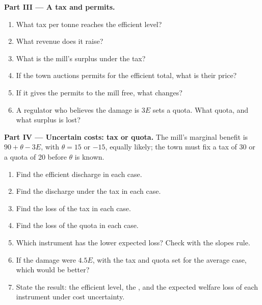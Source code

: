 \begin{problem}
\medskip
\noindent\textbf{Part III --- A tax and permits.}
\begin{enumerate}[resume]
  \item What tax per tonne reaches the efficient level?
  \item What revenue does it raise?
  \item What is the mill's surplus under the tax?
  \item If the town auctions permits for the efficient total, what is their price?
  \item If it gives the permits to the mill free, what changes?
  \item A regulator who believes the damage is $3E$ sets a quota. What quota, and what surplus is lost?
\end{enumerate}

\medskip
\noindent\textbf{Part IV --- Uncertain costs: tax or quota.} The mill's marginal benefit is $90 + \theta - 3E$, with $\theta = 15$ or $-15$, equally likely; the
town must fix a tax of 30 or a quota of 20 before $\theta$ is known.
\begin{enumerate}[resume]
  \item Find the efficient discharge in each case.
  \item Find the discharge under the tax in each case.
  \item Find the loss of the tax in each case.
  \item Find the loss of the quota in each case.
  \item Which instrument has the lower expected loss? Check with the slopes rule.
  \item If the damage were $4.5E$, with the tax and quota set for the average case, which would be better?
  \item State the result: the efficient level, the , and the expected welfare loss of each instrument under
    cost uncertainty.
\end{enumerate}
\end{problem}
